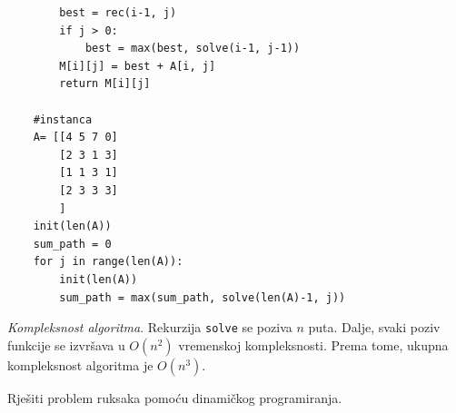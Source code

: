 \begin{solution}
\begin{verbatim}
		best = rec(i-1, j)
		if j > 0:
			best = max(best, solve(i-1, j-1))
		M[i][j] = best + A[i, j]
		return M[i][j]

	#instanca
	A= [[4 5 7 0]
    	[2 3 1 3]
    	[1 1 3 1]
    	[2 3 3 3]
        ]	
	init(len(A))
	sum_path = 0
	for j in range(len(A)):
		init(len(A))
		sum_path = max(sum_path, solve(len(A)-1, j))
\end{verbatim}

\textit{Kompleksnost algoritma}. Rekurzija \texttt{solve} se poziva  $n$ puta. Dalje,  svaki poziv funkcije se izvršava u $O(n^2)$ vremenskoj kompleksnosti. Prema tome, ukupna kompleksnost algoritma je $O(n^3)$.

\end{solution}



\begin{example}
	Rješiti problem ruksaka pomoću dinamičkog programiranja. 
\end{example}

